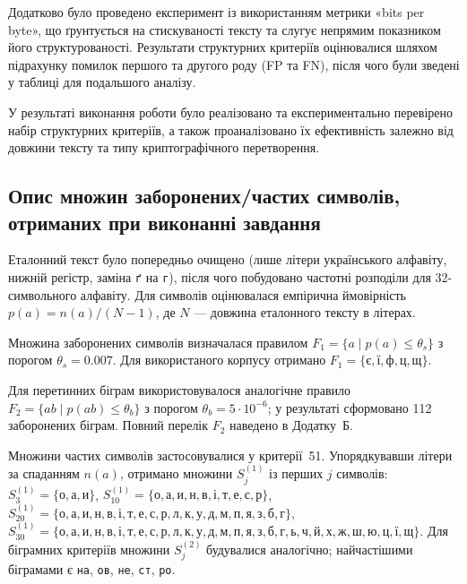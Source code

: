 \documentclass{article}
\begin{document}
Додатково було проведено експеримент із використанням метрики «bits per byte», що ґрунтується на стискуваності тексту та слугує непрямим показником його структурованості. Результати структурних критеріїв оцінювалися шляхом підрахунку помилок першого та другого роду (FP та FN), після чого були зведені у таблиці для подальшого аналізу.

У результаті виконання роботи було реалізовано та експериментально перевірено набір структурних критеріїв, а також проаналізовано їх ефективність залежно від довжини тексту та типу криптографічного перетворення.

\subsection{Опис множин заборонених/частих символів, отриманих при виконанні завдання}

Еталонний текст було попередньо очищено (лише літери українського алфавіту, нижній регістр, заміна \texttt{ґ} на \texttt{г}), після чого побудовано частотні розподіли для 32-символьного алфавіту. Для символів оцінювалася емпірична ймовірність \(p(a)=n(a)/(N-1)\), де \(N\) --- довжина еталонного тексту в літерах.

Множина заборонених символів визначалася правилом \(F_{1}=\{a \mid p(a)\le\theta_{s}\}\) з порогом \(\theta_{s}=0.007\). Для використаного корпусу отримано \(F_{1}=\{\text{є}, \text{ї}, \text{ф}, \text{ц}, \text{щ}\}\).

Для перетинних біграм використовувалося аналогічне правило \(F_{2}=\{ab \mid p(ab)\le\theta_{b}\}\) з порогом \(\theta_{b}=5\cdot10^{-6}\); у результаті сформовано 112 заборонених біграм. Повний перелік \(F_{2}\) наведено в Додатку~Б.

Множини частих символів застосовувалися у критерії~51. Упорядкувавши літери за спаданням \(n(a)\), отримано множини \(S^{(1)}_{j}\) із перших \(j\) символів: \(S^{(1)}_{3}=\{\text{о}, \text{а}, \text{и}\}\), \(S^{(1)}_{10}=\{\text{о}, \text{а}, \text{и}, \text{н}, \text{в}, \text{і}, \text{т}, \text{е}, \text{с}, \text{р}\}\), \(S^{(1)}_{20}=\{\text{о}, \text{а}, \text{и}, \text{н}, \text{в}, \text{і}, \text{т}, \text{е}, \text{с}, \text{р}, \text{л}, \text{к}, \text{у}, \text{д}, \text{м}, \text{п}, \text{я}, \text{з}, \text{б}, \text{г}\}\), \(S^{(1)}_{30}=\{\text{о}, \text{а}, \text{и}, \text{н}, \text{в}, \text{і}, \text{т}, \text{е}, \text{с}, \text{р}, \text{л}, \text{к}, \text{у}, \text{д}, \text{м}, \text{п}, \text{я}, \text{з}, \text{б}, \text{г}, \text{ь}, \text{ч}, \text{й}, \text{х}, \text{ж}, \text{ш}, \text{ю}, \text{ц}, \text{ї}, \text{щ}\}\).
Для біграмних критеріїв множини \(S^{(2)}_{j}\) будувалися аналогічно; найчастішими біграмами є \texttt{на}, \texttt{ов}, \texttt{не}, \texttt{ст}, \texttt{ро}.
\end{document}
